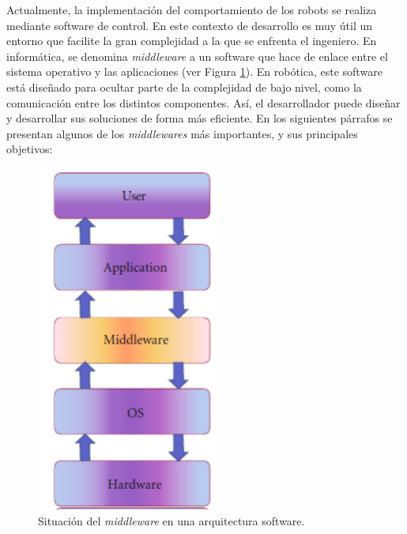 \documentclass[12pt,spanish,chapterprefix, numbers=noenddot]{book}
\numberwithin{equation}{section}
\numberwithin{figure}{section}
\begin{document}
Actualmente, la implementación del comportamiento de los robots se realiza mediante software de control. En este contexto de desarrollo es muy útil un entorno que facilite la gran complejidad a la que se enfrenta el ingeniero. En informática, se denomina \textit{middleware} a un software que hace de enlace entre el sistema operativo y las aplicaciones (ver Figura \ref{fig:middleware}). En robótica, este software está diseñado para ocultar parte de la complejidad de bajo nivel, como la comunicación entre los distintos componentes. Así, el desarrollador puede diseñar y desarrollar sus soluciones de forma más eficiente. En los siguientes párrafos se presentan algunos de los \textit{middlewares} más importantes, y sus principales objetivos: 
\begin{figure}[hbt!]
\centering
\includegraphics[width=6cm]{Figs/layersMiddleware.png}
\par
\caption{\label{fig:middleware}Situación del \textit{middleware} en una arquitectura software.}
\end{figure}
\end{document}
